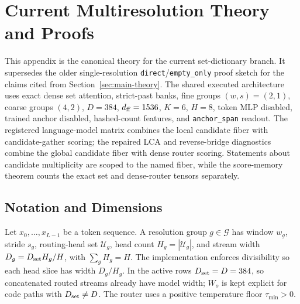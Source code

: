 \documentclass{article}
\theoremstyle{plain}
\theoremstyle{definition}
\theoremstyle{remark}
\begin{document}







\section{Current Multiresolution Theory and Proofs}
\label{sec:theory}

This appendix is the canonical theory for the current set-dictionary branch.
It supersedes the older single-resolution
\texttt{direct}/\texttt{empty\_only} proof sketch for the claims cited from
Section~\ref{sec:main-theory}.  The shared executed architecture uses exact
dense set attention, strict-past banks, fine groups $(w,s)=(2,1)$, coarse
groups $(4,2)$, $D=384$, $d_{\rm ff}=1536$, $K=6$, $H=8$, token MLP disabled,
trained anchor disabled, hashed-count features, and \texttt{anchor\_span}
readout.  The registered language-model matrix combines the local candidate
fiber with candidate-gather scoring; the repaired LCA and reverse-bridge
diagnostics combine the global candidate fiber with dense router scoring.
Statements about candidate multiplicity are scoped to the named fiber, while
the score-memory theorem counts the exact set and dense-router tensors
separately.

\subsection{Notation and Dimensions}
\label{sec:mrp6-notation}

Let $x_0,\ldots,x_{L-1}$ be a token sequence.  A resolution group $g\in\mathcal G$ has window $w_g$, stride $s_g$, routing-head set $\mathcal U_g$, head count $H_g=|\mathcal U_g|$, and stream width $D_g=D_{\rm set}H_g/H$, with $\sum_gH_g=H$.  The implementation enforces divisibility so each head slice has width $D_g/H_g$.  In the active rows $D_{\rm set}=D=384$, so concatenated routed streams already have model width; $W_o$ is kept explicit for code paths with $D_{\rm set}\ne D$.  The router uses a positive temperature floor $\tau_{\min}>0$.
\end{document}
